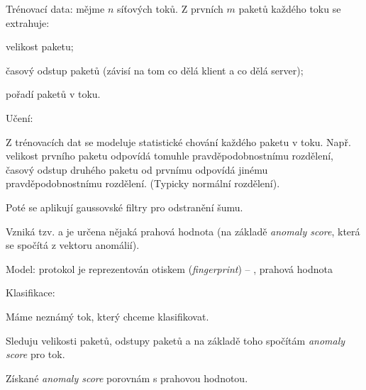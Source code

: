 \begin{compactitem}
    \item Trénovací data: mějme $n$ síťových toků. Z prvních $m$ paketů každého toku se extrahuje: \begin{compactitem}
        \item velikost paketu;
        \item časový odstup paketů (závisí na tom co dělá klient a co dělá server);
        \item pořadí paketů v toku.
    \end{compactitem}
    \item Učení: \begin{compactitem}
        \item Z trénovacích dat se modeluje statistické chování každého paketu v toku. Např. velikost prvního paketu odpovídá tomuhle pravděpodobnostnímu rozdělení, časový odstup druhého paketu od prvnímu odpovídá jinému pravděpodobnostnímu rozdělení. (Typicky normální rozdělení).
        \item Poté se aplikují gaussovské filtry pro odstranění šumu.
        \item Vzniká tzv.  a je určena nějaká prahová hodnota (na základě \textit{anomaly score}, která se spočítá z vektoru anomálií).
    \end{compactitem}
    \item Model: protokol je reprezentován otiskem (\textit{fingerprint}) -- , prahová hodnota
    \item Klasifikace: \begin{compactitem}
        \item Máme neznámý tok, který chceme klasifikovat.
        \item Sleduju velikosti paketů, odstupy paketů a na základě toho spočítám \textit{anomaly score} pro tok.
        \item Získané \textit{anomaly score} porovnám s prahovou hodnotou.
    \end{compactitem}
\end{compactitem}

